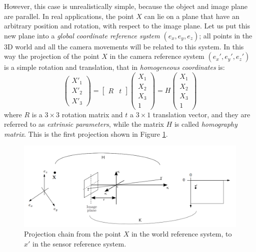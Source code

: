 However, this case is unrealistically simple, because the object and image plane are parallel. In real applications, the point $X$ can lie on a plane that have an arbitrary position and rotation, with respect to the image plane. Let us put this new plane into a \textit{global coordinate reference system} $\left( e_x, e_y, e_z \right)$; all points in the 3D world and all the camera movements will be related to this system.
In this way the projection of the point $X$ in the camera reference system $\left( e_x', e_y', e_z' \right)$ is a simple rotation and translation, that in \textit{homogeneous coordinates} is:
  \begin{equation}
    \label{eq:extrinsic}
    \begin{pmatrix}
      X'_1 \\ X'_2 \\ X'_3
    \end{pmatrix}
    =
    \begin{bmatrix}
      R & t
    \end{bmatrix}
    \begin{pmatrix}
      X_1 \\ X_2 \\ X_3 \\ 1
    \end{pmatrix}
    =
    H
    \begin{pmatrix}
      X_1 \\ X_2 \\ X_3 \\ 1
    \end{pmatrix}
  \end{equation}
where $R$ is a $3 \times 3$ rotation matrix and $t$ a $3 \times 1$ translation vector, and they are referred to as \textit{extrinsic parameters}, while the matrix $H$ is called \textit{homography matrix}. This is the first projection shown in Figure \ref{fig:perspective_projection}.
\begin{figure}[t!]
  \centering
  \includegraphics[width=\textwidth]{./images/tech/perspective_projection.PNG}
  \caption{Projection chain from the point $X$ in the world reference system, to $x'$ in the sensor reference system.}
  \label{fig:perspective_projection}
\end{figure} \\

